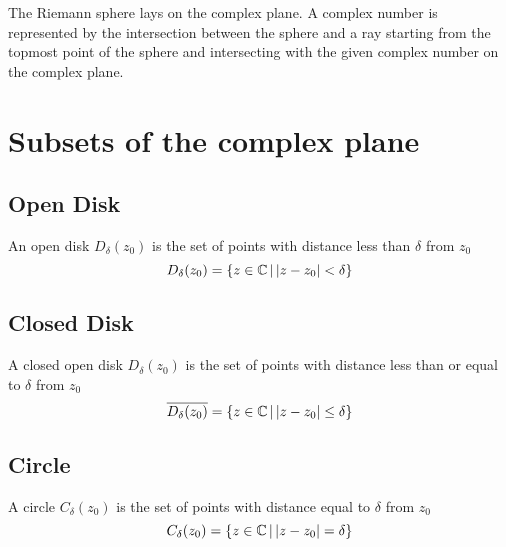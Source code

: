 \documentclass[a4paper]{article}
\begin{document}

The Riemann sphere lays on the complex plane. A complex number
is represented by the intersection between the sphere
and a ray starting from the topmost point of the sphere
and intersecting with the given complex number on the complex plane.

\section{Subsets of the complex plane}

\subsection{Open Disk}

An open disk \(D_\delta(z_0)\) is the set of points
with distance less than \(\delta\) from \(z_0\)
\[
    D_\delta(z_0)=\{z\in \mathbb{C} \,|\, |z-z_0|<\delta\}
\]

\subsection{Closed Disk}

A closed open disk \(D_\delta(z_0)\) is the set of points
with distance less than or equal to \(\delta\) from \(z_0\)
\[
    \overline{D_\delta(z_0)}=\{z\in \mathbb{C} \,|\, |z-z_0|\leq\delta\}
\]

\subsection{Circle}

A circle \(C_\delta(z_0)\) is the set of points
with distance equal to \(\delta\) from \(z_0\)
\[
    C_\delta(z_0)=\{z\in \mathbb{C} \,|\, |z-z_0|=\delta\}
\]
\end{document}
